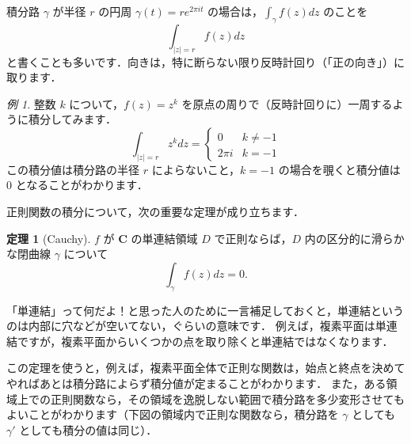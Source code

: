 \documentclass{ltjsarticle}
\newcommand{\Complex}{\mathbf{C}}
\newcommand{\ImagI}{i}%
\newcommand{\abs}[1]{\left\lvert #1\right\rvert}
\theoremstyle{definition}
\newtheorem{theorem}{定理}
\theoremstyle{remark}
\newtheorem{example}{例}
\begin{document}
積分路 $\gamma$ が半径 $r$ の円周 $\gamma(t)=re^{2\pi\ImagI t}$ の場合は，$\int_\gamma f(z)dz$ のことを
\[\int_{\abs{z}=r} f(z)dz\]
と書くことも多いです．向きは，特に断らない限り反時計回り（「正の向き」）に取ります．


\begin{example} \label{example:integrate-z^k}
  整数 $k$ について，$f(z)=z^k$ を原点の周りで（反時計回りに）一周するように積分してみます．
  \[
  \int_{\abs{z}=r} z^k dz=\begin{cases}
  0 & k\ne -1 \\
  2\pi i & k=-1
  \end{cases}
  \]
  この積分値は積分路の半径 $r$ によらないこと，$k=-1$ の場合を覗くと積分値は $0$ となることがわかります．
\end{example}

正則関数の積分について，次の重要な定理が成り立ちます．

\begin{theorem}[Cauchy]
  $f$ が $\Complex$ の単連結領域 $D$ で正則ならば，$D$ 内の区分的に滑らかな閉曲線 $\gamma$ について
  \[\int_\gamma f(z)dz=0.\]
\end{theorem}

「単連結」って何だよ！と思った人のために一言補足しておくと，単連結というのは内部に穴などが空いてない，ぐらいの意味です．
例えば，複素平面は単連結ですが，複素平面からいくつかの点を取り除くと単連結ではなくなります．

この定理を使うと，例えば，複素平面全体で正則な関数は，始点と終点を決めてやればあとは積分路によらず積分値が定まることがわかります．
また，ある領域上での正則関数なら，その領域を逸脱しない範囲で積分路を多少変形させてもよいことがわかります（下図の領域内で正則な関数なら，積分路を $\gamma$ としても $\gamma'$ としても積分の値は同じ）．
\end{document}
